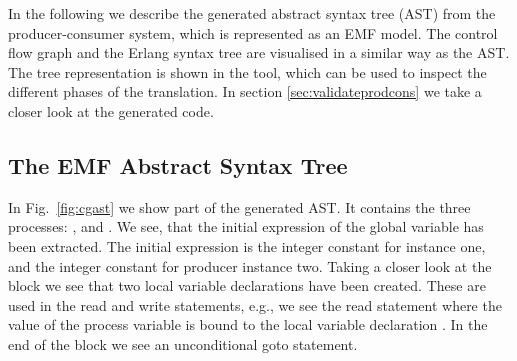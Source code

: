 In the following we describe the generated abstract syntax tree (AST) from the producer-consumer system, which is represented as an EMF model. The control flow graph and the Erlang syntax tree are visualised in a similar way as the AST. The tree representation is shown in the tool, which can be used to inspect the different phases of the translation. In section \ref{sec:validateprodcons} we take a closer look at the generated code.

%

\subsection{The EMF Abstract Syntax Tree}
In Fig.~\ref{fig:cgast} we show part of the generated AST. It contains the three processes: ,  and . We see, that the initial expression of the global variable  has been extracted. The initial expression is the integer constant  for  instance one, and the integer constant  for producer instance two. Taking a closer look at the block  we see that two local variable declarations have been created. These are used in the read and write statements, e.g., we see the read statement where the value of the process variable  is bound to the local variable declaration . In the end of the block we see an unconditional goto statement.


